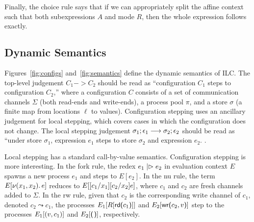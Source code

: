 Finally, the choice rule says that if we can appropriately split the affine
context such that both subexpressions $A$ and mode $R$, then the whole
expression follows exactly.

\subsection{Dynamic Semantics}
\label{subsec:semantics}



Figures~\ref{fig:configs} and~\ref{fig:semantics} define the dynamic semantics
of ILC. The top-level judgement $C_1 -> C_2$ should be read as ``configuration
$C_1$ steps to configuration $C_2$,'' where a configuration $C$ consists of a
set of communication channels $\Sigma$ (both read-ends and write-ends), a process
pool $\pi$, and a store $\sigma$ (a finite map from locations $\ell$ to
values). Configuration stepping uses an ancillary judgement for local stepping,
which covers cases in which the configuration does not change.  The
local stepping judgement $\sigma_1; \epsilon_1 \longrightarrow \sigma_2; \epsilon_2$ should be read as ``under store
$\sigma_1$, expression $e_1$ steps to store $\sigma_{2}$ and expression
$e_2$. .

Local stepping has a standard call-by-value semantics. Configuration stepping is
more interesting. In the fork rule, the redex $e_1 \mathrel{|\rhd} e_2$ in evaluation
context $E$ spawns a new process $e_1$ and steps to $E[e_2]$. In the nu rule,
the term $E[ \nu(x_1, x_2).\,e ]$ reduces to $E[
  [c_1/x_1][c_2/x_2]e ]$, where $c_1$ and $c_2$ are fresh
channels added to $\Sigma$. In the rw rule, given that $c_2$ is the corresponding
write channel of $c_1$, denoted $c_2 \leadsto c_1$, the processes $E_1[R[
    \text{\textsf{rd}}\textsf{(}{c_1}\textsf{)}] ]$ and $E_2[ \text{\textsf{wr}}\textsf{(}{c_2},{v}\textsf{)}]$ step to the processes
$E_1[ (v, c_1)]$ and $E_2[ \eUnit]$, respectively. 
